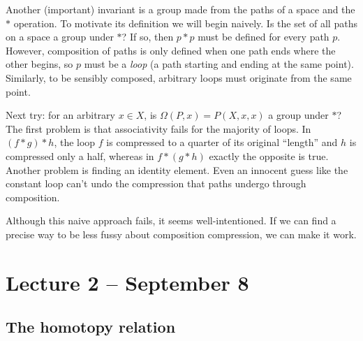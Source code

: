 \documentclass[letterpaper]{article}
\begin{document}
Another (important) invariant is a group made from the paths of a space and the $\ast$ operation. To motivate its definition we will begin naively. Is the set of all paths on a space a group under $\ast$? If so, then $p \ast p$ must be defined for every path $p$. However, composition of paths is only defined when one path ends where the other begins, so $p$ must be a \emph{loop} (a path starting and ending at the same point). Similarly, to be sensibly composed, arbitrary loops must originate from the same point.

Next try: for an arbitrary $x \in X$, is $\Omega(P, x) = P(X, x, x)$ a group under $\ast$? The first problem is that associativity fails for the majority of loops. In $(f \ast g) \ast h$, the loop $f$ is compressed to a quarter of its original ``length'' and $h$ is compressed only a half, whereas in $f \ast (g \ast h)$ exactly the opposite is true. Another problem is finding an identity element. Even an innocent guess like the constant loop can't undo the compression that paths undergo through composition.

Although this naive approach fails, it seems well-intentioned. If we can find a precise way to be less fussy about composition compression, we can make it work.

\section{Lecture 2 -- September 8}

\subsection{The homotopy relation}
\end{document}
